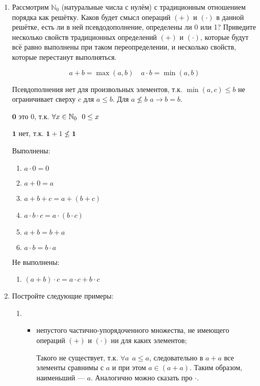 \begin{enumerate}
    \item Рассмотрим $\mathbb{N}_0$ (натуральные числа с нулём) с традиционным отношением порядка как решётку.
          Каков будет смысл операций $(+)$ и $(\cdot)$ в данной решётке, есть ли в ней псевдодополнение,
          определены ли 0 или 1? Приведите несколько свойств традиционных определений $(+)$ и $(\cdot)$,
          которые будут всё равно выполнены при таком переопределении, и несколько свойств, которые перестанут выполняться.

          \[a + b = \max(a, b) \quad a \cdot b = \min(a, b)\]

          Псевдополнения нет для произвольных элементов, т.к. \(\min(a, c) \leq b\) не ограничивает сверху \(c\) для \(a \leq b\). Для \(a \not \leq b\) \(a \to b = b\).

          \(\mathbf 0\) это \(0\), т.к. \(\forall x\in\mathbb{N}_0 \ \ 0 \leq x\)

          \(\mathbf 1\) нет, т.к. \(\mathbf 1 + 1 \not \leq \mathbf 1\)

          Выполнены:
          \begin{enumerate}
              \item \(a \cdot 0 = 0\)
              \item \(a + 0 = a\)
              \item \(a + b + c = a + (b + c)\)
              \item \(a \cdot b \cdot c = a \cdot (b \cdot c)\)
              \item \(a + b = b + a\)
              \item \(a\cdot b = b\cdot a\)
          \end{enumerate}

          Не выполнены:
          \begin{enumerate}
              \item \((a + b) \cdot c = a\cdot c + b\cdot c\)
          \end{enumerate}

    \item Постройте следующие примеры:
          \begin{enumerate}
              \item \begin{itemize}
                        \item непустого частично-упорядоченного множества, не имеющего операций $(+)$ и $(\cdot)$ ни для каких элементов;

                              Такого не существует, т.к. \(\forall a \ \ a \leq a\), следовательно в \(a + a\) все элементы сравнимы с \(a\) и при этом \(a\in(a + a)\). Таким образом, наименьший --- \(a\). Аналогично можно сказать про \(\cdot\).


\end{itemize}
\end{enumerate}
\end{enumerate}
